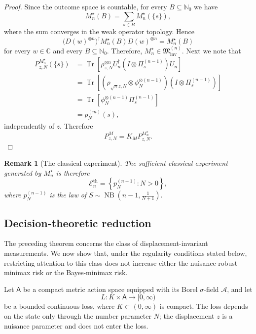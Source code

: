 \documentclass{article}
\newtheorem{remark}{Remark}
\theoremstyle{named}
\theoremstyle{named1}
\newcommand{\N}{\mathbb{N}}
\newcommand{\Tr}{\operatorname{Tr}}
\newcommand{\cE}{\mathcal{E}}
\newcommand{\bbC}{\mathbb C}
\newcommand{\cM}{\mathfrak M}
\theoremstyle{plain}
\theoremstyle{remark}
\begin{document}
\begin{proof}
Since the outcome space is countable, for every
$B\subseteq\N_0$ we have
\[
    M_n^\star(B)
    =
    \sum_{s\in B}M_n^\star(\{s\}),
\]
where the sum converges in the weak operator topology. Hence
\[
    \bigl(D(w)^{\otimes n}\bigr)^\dagger
    M_n^\star(B)
    D(w)^{\otimes n}
    =
    M_n^\star(B)
\]
for every $w\in\bbC$ and every $B\subseteq\N_0$. Therefore,
$M_n^\star\in\cM_{\mathrm{inv}}^{(n)}.$ Next we note that
\begin{align*}
    P_{z,N}^{M_n^\star}(\{s\})&= \Tr[\rho_{z,N}^{\otimes n}U_n^\dagger
    \left(
        I\otimes\Pi_s^{(n-1)}
    \right)
    U_n]\\
    &=\Tr[ \left(\rho_{\sqrt n z,N}
    \otimes
    \phi_N^{\otimes(n-1)}\right)
    \left(
        I\otimes\Pi_s^{(n-1)}
    \right)
    ]\\
    &= \Tr[
    \phi_N^{\otimes(n-1)}
    \Pi_s^{(n-1)}
    ]\\
    &=p_N^{(m)}(s),
\end{align*}
independently of $z$. Therefore
\[
    P_{z,N}^{M}
    =
    K_MP_{z,N}^{M_n^\star}.
\]
\end{proof}

\begin{remark}[The classical experiment]
The sufficient classical experiment generated by
$M_n^\star$ is therefore
\[
    \cE_{n}^{\mathrm{th}}
    =
    \left\{
        p_N^{(n-1)}
        :
        N>0
    \right\},
\]
where
$p_N^{(n-1)}$ is the law of $S
    \sim
    \operatorname{NB}
    \left(
        n-1,\frac{1}{N+1}
    \right).
$
\end{remark}

\subsection{Decision-theoretic reduction}
\label{subsec:thermal-decision}

The preceding theorem concerns the class of displacement-invariant
measurements. We now show that, under the regularity conditions stated
below, restricting attention to this class does not increase either the
nuisance-robust minimax risk or the Bayes-minimax risk.

Let \(\mathsf A\) be a compact metric action space equipped with its Borel
\(\sigma\)-field \(\mathcal A\), and let
\[
    L:K\times\mathsf A\rightarrow[0,\infty)
\]
be a bounded continuous loss, where
$ K\subset(0,\infty)
$
is compact. The loss depends on the state only through the number parameter
\(N\); the displacement \(z\) is a nuisance parameter and does not enter the
loss.
\end{document}
